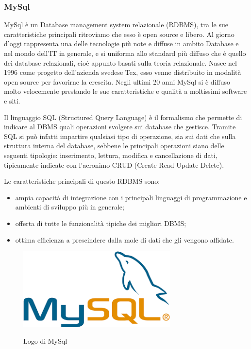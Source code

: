 \subsubsection{MySql}
MySql è un Database management system relazionale (RDBMS), tra le sue caratteristiche principali ritroviamo che esso è open source e libero. Al giorno d'oggi rappresenta una delle tecnologie più note e diffuse in ambito Database e nel mondo dell'IT in generale, e si uniforma allo standard più diffuso che è quello dei database relazionali, cioè appunto basati sulla teoria relazionale. Nasce nel 1996 come progetto dell'azienda svedese Tex, esso venne distribuito in modalità open source per favorirne la crescita. Negli ultimi 20 anni MySql si è diffuso molto velocemente prestando le sue caratteristiche e qualità a moltissimi software e siti. \newline

\noindent Il linguaggio SQL (Structured Query Language) è il formalismo che permette di indicare al DBMS quali operazioni svolgere sui database che gestisce. Tramite SQL si può infatti impartire qualsiasi tipo di operazione, sia sui dati che sulla struttura interna del database, sebbene le principali operazioni siano delle seguenti tipologie: inserimento, lettura, modifica e
cancellazione di dati, tipicamente indicate con l'acronimo CRUD (Create-Read-Update-Delete). \newline

\noindent Le caratteristiche principali di questo RDBMS sono:
\begin{itemize}
    \item ampia capacità di integrazione con i principali linguaggi di programmazione e ambienti di sviluppo più in generale;
    \item offerta di tutte le funzionalità tipiche dei migliori DBMS;
    \item ottima efficienza a prescindere dalla mole di dati che gli vengono affidate.
\end{itemize}

\begin{figure}[H]
    \caption{Logo di MySql ~\cite{redux:online}}
    \centering
    \includegraphics[width=80mm]{img/logos/mysql_logo.png}
    \label{fig:mysql_logo}
\end{figure}
\newpage
